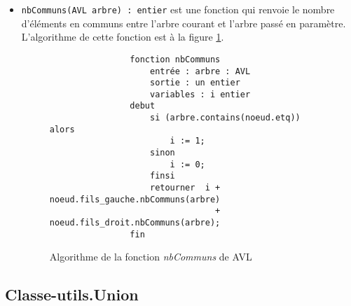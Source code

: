 \documentclass[a4paper]{article}
\begin{document}
\begin{itemize}
			\item \verb|nbCommuns(AVL arbre) : entier| est une fonction qui renvoie le nombre d'éléments en communs entre l'arbre courant et l'arbre passé en paramètre. L'algorithme de cette fonction est à la figure \ref{algo_nbCommuns}.
			
			\begin{figure}
	    	    \begin{verbatim}
	    	    fonction nbCommuns
	    	        entrée : arbre : AVL
	    	        sortie : un entier
	    	        variables : i entier
	    	    debut
	    	        si (arbre.contains(noeud.etq)) alors
	    	            i := 1;
	    	        sinon
	    	            i := 0;
	    	        finsi
	    	        retourner  i + noeud.fils_gauche.nbCommuns(arbre) 
	    	                     + noeud.fils_droit.nbCommuns(arbre);
	    	    fin
	    	    \end{verbatim}
	    	    \caption{Algorithme de la fonction \textit{nbCommuns} de AVL \label{algo_nbCommuns} }
	    	 \end{figure}
	    	 
		\end{itemize}
		
		\subsection{Classe-utils.Union}
\end{document}
